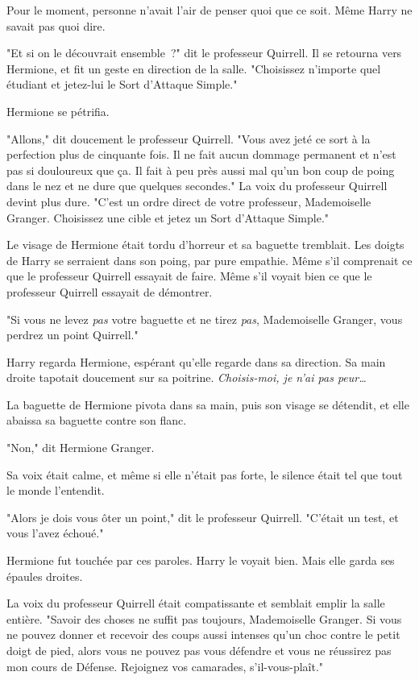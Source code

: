 Pour le moment, personne n'avait l'air de penser quoi que ce soit. Même Harry ne savait pas quoi dire.

"Et si on le découvrait ensemble~?" dit le professeur Quirrell. Il se retourna vers Hermione, et fit un geste en direction de la salle. "Choisissez n'importe quel étudiant et jetez-lui le Sort d'Attaque Simple."

Hermione se pétrifia.

"Allons," dit doucement le professeur Quirrell. "Vous avez jeté ce sort à la perfection plus de cinquante fois. Il ne fait aucun dommage permanent et n'est pas si douloureux que ça. Il fait à peu près aussi mal qu'un bon coup de poing dans le nez et ne dure que quelques secondes." La voix du professeur Quirrell devint plus dure. "C'est un ordre direct de votre professeur, Mademoiselle Granger. Choisissez une cible et jetez un Sort d'Attaque Simple."

Le visage de Hermione était tordu d'horreur et sa baguette tremblait. Les doigts de Harry se serraient dans son poing, par pure empathie. Même s'il comprenait ce que le professeur Quirrell essayait de faire. Même s'il voyait bien ce que le professeur Quirrell essayait de démontrer.

"Si vous ne levez \emph{pas} votre baguette et ne tirez \emph{pas}, Mademoiselle Granger, vous perdrez un point Quirrell."

Harry regarda Hermione, espérant qu'elle regarde dans sa direction. Sa main droite tapotait doucement sur sa poitrine. \emph{Choisis-moi, je n'ai pas peur…}

La baguette de Hermione pivota dans sa main, puis son visage se détendit, et elle abaissa sa baguette contre son flanc.

"Non," dit Hermione Granger.

Sa voix était calme, et même si elle n'était pas forte, le silence était tel que tout le monde l'entendit.

"Alors je dois vous ôter un point," dit le professeur Quirrell. "C'était un test, et vous l'avez échoué."

Hermione fut touchée par ces paroles. Harry le voyait bien. Mais elle garda ses épaules droites.

La voix du professeur Quirrell était compatissante et semblait emplir la salle entière. "Savoir des choses ne suffit pas toujours, Mademoiselle Granger. Si vous ne pouvez donner et recevoir des coups aussi intenses qu'un choc contre le petit doigt de pied, alors vous ne pouvez pas vous défendre et vous ne réussirez pas mon cours de Défense. Rejoignez vos camarades, s'il-vous-plaît."

